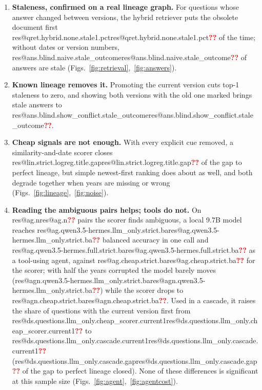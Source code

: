 \documentclass[11pt,a4paper]{article}
\makeatletter
\newcommand{\res}[1]{\ifcsname res@#1\endcsname\csname res@#1\endcsname\else\textcolor{red}{\textbf{??}}\fi}
\makeatother
\begin{document}
\begin{tcolorbox}[enhanced,colback=white,colframe=rule,boxrule=0.6pt,arc=3pt,
  left=10pt,right=10pt,top=6pt,bottom=6pt,
  title={\sffamily\bfseries Key findings},coltitle=accent,colbacktitle=white,
  attach boxed title to top left={xshift=8pt,yshift=-6pt},
  boxed title style={boxrule=0pt,colback=white,left=3pt,right=3pt}]
\small
\begin{enumerate}[label=\textbf{\textcolor{accent}{\arabic*}},leftmargin=1.4em]
\item \textbf{Staleness, confirmed on a real lineage graph.} For questions whose
  answer changed between versions, the hybrid retriever puts the obsolete document
  first \res{qret.hybrid.none.stale1.pct} of the time; without dates or version
  numbers, \res{ans.blind.naive.stale_outcome} of answers are stale
  (Figs.~\ref{fig:retrieval},~\ref{fig:answers}).
\item \textbf{Known lineage removes it.} Promoting the current version cuts
  top-1 staleness to zero, and showing both versions with the old one marked
  brings stale answers to \res{ans.blind.show_conflict.stale_outcome}.
\item \textbf{Cheap signals are not enough.} With every explicit cue removed, a
  similarity-and-date scorer closes \res{lin.strict.logreg.title.gap} of the gap
  to perfect lineage, but simple newest-first ranking does about as well, and both
  degrade together when years are missing or wrong
  (Figs.~\ref{fig:lineage},~\ref{fig:noise}).
\item \textbf{Reading the ambiguous pairs helps; tools do not.} On \res{ag.n} pairs
  the scorer finds ambiguous, a local 9.7B model reaches
  \res{ag.qwen3.5-hermes.llm_only.strict.ba} balanced accuracy in one call and
  \res{ag.qwen3.5-hermes.full.strict.ba} as a tool-using agent, against
  \res{ag.cheap.strict.ba} for the scorer; with half the years corrupted the model
  barely moves (\res{agn.qwen3.5-hermes.llm_only.strict.ba}) while the scorer drops
  to \res{agn.cheap.strict.ba}. Used in a cascade, it raises the share of questions
  with the current version first from \res{ds.questions.llm_only.cheap_scorer.current1}
  to \res{ds.questions.llm_only.cascade.current1}
  (\res{ds.questions.llm_only.cascade.gap} of the gap to perfect lineage closed).
  None of these differences is significant at this sample size
  (Figs.~\ref{fig:agent},~\ref{fig:agentcost}).
\end{enumerate}
\end{tcolorbox}
\end{document}
